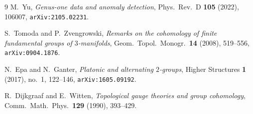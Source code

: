 \documentclass[11pt]{amsart}
\theoremstyle{definition}
\theoremstyle{remark}
\begin{document}
\begin{thebibliography}{9}
M.~Yu, \emph{Genus-one data and anomaly detection}, Phys.\ Rev.\ D \textbf{105} (2022), 106007, \texttt{arXiv:2105.02231}.

S.~Tomoda and P.~Zvengrowski, \emph{Remarks on the cohomology of finite fundamental groups of $3$-manifolds}, Geom.\ Topol.\ Monogr.\ \textbf{14} (2008), 519--556, \texttt{arXiv:0904.1876}.

N.~Epa and N.~Ganter, \emph{Platonic and alternating $2$-groups}, Higher Structures \textbf{1} (2017), no.~1, 122--146, \texttt{arXiv:1605.09192}.

R.~Dijkgraaf and E.~Witten, \emph{Topological gauge theories and group cohomology}, Comm.\ Math.\ Phys.\ \textbf{129} (1990), 393--429.
\end{thebibliography}
\end{document}

